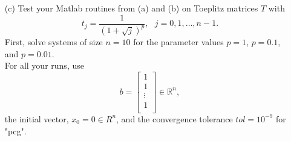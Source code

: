 \documentclass[12pt]{article}
\def\R{\mathbb{R}}
\begin{document}
\begin{itemize}
\lstset{language=matlab,frame=single}
\begin{lstlisting}[caption=]
function [x,relres,iter] = ToepCircPCG(p,n)

format long e
tol = 10^(-9);
maxit = n;
b = ones(n,1);

i=(0:n-1);
t = 1./((1 + sqrt(i)).^p);

c = ((n:-1:1).*t + (0:(n-1)).*t([1,end:-1:2]))./n;

[x,flag,relres,iter] = pcg(@(x) TmultFunct(t,x),b,tol,maxit,@(x) cTimult(c,x))

    % function to multiply matrix C_T^-1 and vector v
    function h = cTimult(c,v)
        lambdaVec = 1./conj(fft(c'));
        h = conj(fft(conj(lambdaVec.*fft(v))))/n;
    end

    % function to multiply topelitz matrix T and z
    function y = TmultFunct(t,z)
        y = fftToeplitz(t,z);
    end        
end
\end{lstlisting}	\qed			
					
					
					

\item[(c)]  Test your Matlab routines from (a) and (b) on Toeplitz matrices $T$ with 
$$t_j = \frac{1}{\left(1 + \sqrt{j}\right)^p}, \text{ } j=0,1,\dots,n-1.$$
First, solve systems of size $n=10$ for the parameter values $p=1$, $p=0.1$, and $p=0.01$.\\

For all your runs, use
$$b = \begin{bmatrix}
		1 \\
		1 \\
		\vdots \\
		1 \\
		\end{bmatrix} \in \R^n,$$
the initial vector, $x_0 = 0 \in R^n$, and the convergence tolerance $tol = 10^{-9}$ for "pcg".\\


\end{itemize}
\end{document}
